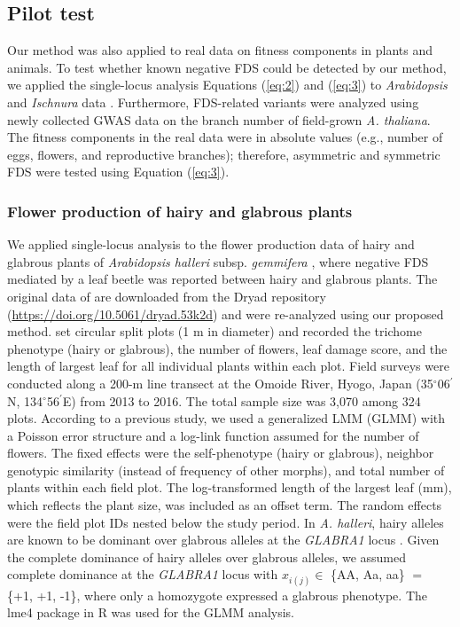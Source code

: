 \documentclass[12pt,]{article}
\begin{document}
\subsection{Pilot test}
Our method was also applied to real data on fitness components in plants and animals. To test whether known negative FDS could be detected by our method, we applied the single-locus analysis Equations (\ref{eq:2}) and (\ref{eq:3}) to \textit{Arabidopsis} and \textit{Ischnura} data \citep{sato2017herbivore, takahashi2014evolution}. Furthermore, FDS-related variants were analyzed using newly collected GWAS data on the branch number of field-grown \textit{A. thaliana}. The fitness components in the real data were in absolute values (e.g., number of eggs, flowers, and reproductive branches); therefore, asymmetric and symmetric FDS were tested using Equation (\ref{eq:3}).

\subsubsection{Flower production of hairy and glabrous plants}
We applied single-locus analysis to the flower production data of hairy and glabrous plants of \textit{Arabidopsis halleri} subsp. \textit{gemmifera} \citep{sato2017herbivore}, where negative FDS mediated by a leaf beetle was reported between hairy and glabrous plants. The original data of \cite{sato2017herbivore} are downloaded from the Dryad repository (\url{https://doi.org/10.5061/dryad.53k2d}) and were re-analyzed using our proposed method. \cite{sato2017herbivore} set circular split plots (1 m in diameter) and recorded the trichome phenotype (hairy or glabrous), the number of flowers, leaf damage score, and the length of largest leaf for all individual plants within each plot. Field surveys were conducted along a 200-m line transect at the Omoide River, Hyogo, Japan (35$^\circ$06$^\prime$N, 134$^\circ$56$^\prime$E) from 2013 to 2016. The total sample size was 3,070 among 324 plots. According to a previous study, we used a generalized LMM (GLMM) with a Poisson error structure and a log-link function assumed for the number of flowers. The fixed effects were the self-phenotype (hairy or glabrous), neighbor genotypic similarity (instead of frequency of other morphs), and total number of plants within each field plot. The log-transformed length of the largest leaf (mm), which reflects the plant size, was included as an offset term. The random effects were the field plot IDs nested below the study period. In \textit{A. halleri}, hairy alleles are known to be dominant over glabrous alleles at the \textit{GLABRA1} locus \citep{shimizu2002ecology, kawagoe2011coexistence}. Given the complete dominance of hairy alleles over glabrous alleles, we assumed complete dominance at the \textit{GLABRA1} locus with $x_{i(j)} \in$ \{AA, Aa, aa\} $=$ \{+1, +1, -1\}, where only a homozygote expressed a glabrous phenotype. The lme4 package \citep{bates2015} in R was used for the GLMM analysis.
\end{document}
